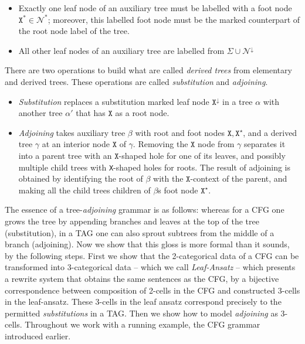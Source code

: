 \begin{defn}
\begin{itemize}
{\begin{itemize}
{\begin{itemize}
			\item{Exactly one leaf node of an auxiliary tree must be labelled with a foot node $\texttt{X}^{*} \in \mathcal{N}^{*}$; moreover, this labelled foot node must be the marked counterpart of the root node label of the tree.}
			\item{All other leaf nodes of an auxiliary tree are labelled from $\Sigma \cup \mathcal{N}^{\downarrow}$}
		\end{itemize}
		}
	\end{itemize}
	}
\end{itemize}
There are two operations to build what are called \emph{derived trees} from elementary and derived trees. These operations are called \emph{substitution} and \emph{adjoining}.
\begin{itemize}
	\item{\emph{Substitution} replaces a substitution marked leaf node $\texttt{X}^\downarrow$ in a tree $\alpha$ with another tree $\alpha'$ that has $\texttt{X}$ as a root node.}
	\item{\emph{Adjoining} takes auxiliary tree $\beta$ with root and foot nodes $\texttt{X},\texttt{X}^\star$, and a derived tree $\gamma$ at an interior node $\texttt{X}$ of $\gamma$. Removing the $\texttt{X}$ node from $\gamma$ separates it into a parent tree with an $\texttt{X}$-shaped hole for one of its leaves, and possibly multiple child trees with \texttt{X}-shaped holes for roots. The result of adjoining is obtained by identifying the root of $\beta$ with the $\texttt{X}$-context of the parent, and making all the child trees children of $\beta$s foot node $\texttt{X}^\star$.}
\end{itemize}
\end{defn}

The essence of a tree-\emph{adjoining} grammar is as follows: whereas for a CFG one grows the tree by appending branches and leaves at the top of the tree (substitution), in a TAG one can also sprout subtrees from the middle of a branch (adjoining). Now we show that this gloss is more formal than it sounds, by the following steps. First we show that the 2-categorical data of a CFG can be transformed into 3-categorical data -- which we call \emph{Leaf-Ansatz} -- which presents a rewrite system that obtains the same sentences as the CFG, by a bijective correspondence between composition of 2-cells in the CFG and constructed 3-cells in the leaf-ansatz. These 3-cells in the leaf ansatz correspond precisely to the permitted \emph{substitutions} in a TAG. Then we show how to model \emph{adjoining} as 3-cells. Throughout we work with a running example, the CFG grammar introduced earlier.

